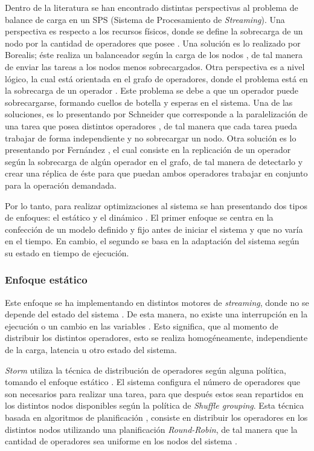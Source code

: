 \documentclass[12pt,letterpaper]{article}
\begin{document}
Dentro de la literatura se han encontrado distintas perspectivas al problema de balance de carga en un SPS (Sistema de Procesamiento de \textsl{Streaming}). Una perspectiva es respecto a los recursos físicos, donde se define la sobrecarga de un nodo por la cantidad de operadores que posee \cite{MadsenTZ14}. Una solución es lo realizado por Borealis; éste realiza un balanceador según la carga de los nodos \cite{XingZH05}, de tal manera de enviar las tareas a los nodos menos sobrecargados. Otra perspectiva es a nivel lógico, la cual está orientada en el grafo de operadores, donde el problema está en la sobrecarga de un operador \cite{FernandezMKP13}. Este problema se debe a que un operador puede sobrecargarse, formando cuellos de botella y  esperas en el sistema. Una de las soluciones, es lo presentando por Schneider que corresponde a la paralelización de una tarea que posea distintos operadores \cite{SchneiderAGBW09}, de tal manera que cada tarea pueda trabajar de forma independiente y no sobrecargar un nodo. Otra solución es lo presentando por Fernández \cite{FernandezMKP13}, el cual consiste en la replicación de un operador según la sobrecarga de algún operador en el grafo, de tal manera de detectarlo y crear una réplica de éste para que puedan ambos operadores trabajar en conjunto para la operación demandada.

Por lo tanto, para realizar optimizaciones al sistema se han presentando dos tipos de enfoques: el estático y el dinámico \cite{Dong06schedulingalgorithms}. El primer enfoque se centra en la confección de un modelo definido y fijo antes de iniciar el sistema y que no varía en el tiempo. En cambio, el segundo se basa en la adaptación del sistema según su estado en tiempo de ejecución.

\subsubsection{Enfoque estático}

Este enfoque se ha implementando en distintos motores de \textsl{streaming}, donde no se depende del estado del sistema \cite{stormtwitter, s4}. De esta manera, no existe una interrupción en la ejecución o un cambio en las variables  \cite{CasavantK88}. Esto significa, que al momento de distribuir los distintos operadores, esto se realiza homogéneamente, independiente de la carga, latencia u otro estado del sistema.

\textsl{Storm} utiliza la técnica de distribución de operadores según alguna política, tomando el enfoque estático \cite{stormtwitter}. El sistema configura el número de operadores que son necesarios para realizar una tarea, para que después estos sean repartidos en los distintos nodos disponibles según la política de \textit{Shuffle grouping}. Esta técnica basada en algoritmos de planificación \cite{bookScheduling}, consiste en distribuir los operadores en los distintos nodos utilizando una planificación \textsl{Round-Robin}, de tal manera que la cantidad de operadores sea uniforme en los nodos del sistema \cite{bookstorm}.
\end{document}
